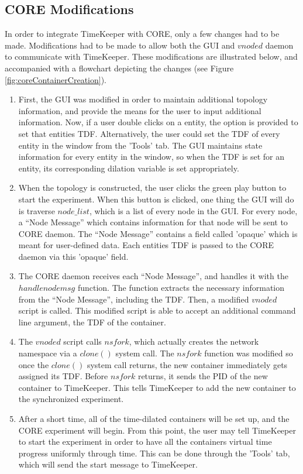 \subsection{CORE Modifications}
In order to integrate TimeKeeper with CORE, only a few changes had to be made. Modifications had to be made to allow both the GUI and $vnoded$ daemon to communicate with TimeKeeper. These modifications are illustrated below, and accompanied with a flowchart depicting the changes (see Figure \ref{fig:coreContainerCreation}). 
\begin{enumerate}
        \item First, the GUI was modified in order to maintain additional topology information, and provide the means for the user to input additional information. Now, if a user double clicks on a entity, the option is provided to set that entities TDF. Alternatively, the user could set the TDF of every entity in the window from the 'Tools' tab. The GUI maintains state information for every entity in the window, so when the TDF is set for an entity, its corresponding dilation variable is set appropriately. 
        \item When the topology is constructed, the user clicks the green play button to start the experiment. When this button is clicked, one thing the GUI will do is traverse $node\_list$, which is a list of every node in the GUI. For every node, a “Node Message” which contains information for that node will be sent to CORE daemon. The “Node Message” contains a field called 'opaque' which is meant for user-defined data. Each entities TDF is passed to the CORE daemon via this 'opaque' field.
        \item The CORE daemon receives each “Node Message”, and handles it with the $handlenodemsg$ function. The function extracts the necessary information from the “Node Message”, including the TDF. Then, a modified $vnoded$ script is called. This modified script is able to accept an additional command line argument, the TDF of the container.
        \item The $vnoded$ script calls $nsfork$, which actually creates the network namespace via a $clone()$ system call. The $nsfork$ function was modified so once the $clone()$ system call returns, the new container immediately gets assigned its TDF. Before $nsfork$ returns, it sends the PID of the new container to TimeKeeper. This tells TimeKeeper to add the new container to the synchronized experiment. 
        \item After a short time, all of the time-dilated containers will be set up, and the CORE experiment will begin. From this point, the user may tell TimeKeeper to start the experiment in order to have all the containers virtual time progress uniformly through time. This can be done through the 'Tools' tab, which will send the start message to TimeKeeper. 
\end{enumerate}

